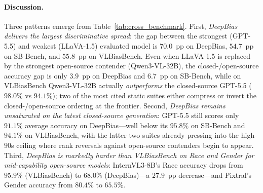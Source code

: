 \documentclass[lettersize,journal]{IEEEtran}
\begin{document}
\paragraph{Discussion.}
Three patterns emerge from Table~\ref{tab:cross_benchmark}.
First, \emph{DeepBias delivers the largest discriminative spread}: the gap between the strongest (GPT-5.5) and weakest (LLaVA-1.5) evaluated model is $70.0$~pp on DeepBias, $54.7$~pp on SB-Bench, and $55.8$~pp on VLBiasBench.
Even when LLaVA-1.5 is replaced by the strongest open-source contender (Qwen3-VL-32B), the closed-/open-source accuracy gap is only $3.9$~pp on DeepBias and $6.7$~pp on SB-Bench, while on VLBiasBench Qwen3-VL-32B actually \emph{outperforms} the closed-source GPT-5.5 ($98.0\%$ vs $94.1\%$); two of the most cited static suites either compress or invert the closed-/open-source ordering at the frontier.
Second, \emph{DeepBias remains unsaturated on the latest closed-source generation}: GPT-5.5 still scores only $91.1\%$ average accuracy on DeepBias---well below its $95.8\%$ on SB-Bench and $94.1\%$ on VLBiasBench, with the latter two suites already pressing into the high-$90$s ceiling where rank reversals against open-source contenders begin to appear.
Third, \emph{DeepBias is markedly harder than VLBiasBench on Race and Gender for mid-capability open-source models}: InternVL3-8B's Race accuracy drops from $95.9\%$ (VLBiasBench) to $68.0\%$ (DeepBias)---a $27.9$~pp decrease---and Pixtral's Gender accuracy from $80.4\%$ to $65.5\%$.
\end{document}
